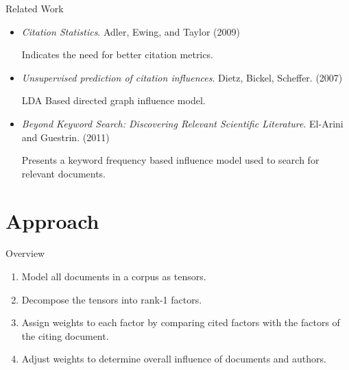 \documentclass{beamer}
\begin{document}
\begin{frame}{Related Work}
    \begin{itemize}[<+->]
        \item {\em Citation Statistics}. Adler, Ewing, and Taylor (2009)
            \par Indicates the need for better citation metrics.\cite{adler2009}
        \item {\em Unsupervised prediction of citation influences}.  Dietz, Bickel, Scheffer. (2007)\cite{dietz2007}
            \par LDA Based directed graph influence model.
        \item {\em Beyond Keyword Search: Discovering Relevant Scientific Literature}. El-Arini and Guestrin. (2011)\cite{el-arini2011}
            \par Presents a keyword frequency based influence model used to search for relevant documents.
    \end{itemize}
\end{frame}


\section{Approach}

\begin{frame}{Overview}
    \begin{enumerate}[<+->]
        \item Model all documents in a corpus as tensors.
        \item Decompose the tensors into rank-1 factors.
        \item Assign weights to each factor by comparing cited factors with the factors of the citing document.
        \item Adjust weights to determine overall influence of documents and authors.
    \end{enumerate}
\end{frame}
\end{document}
